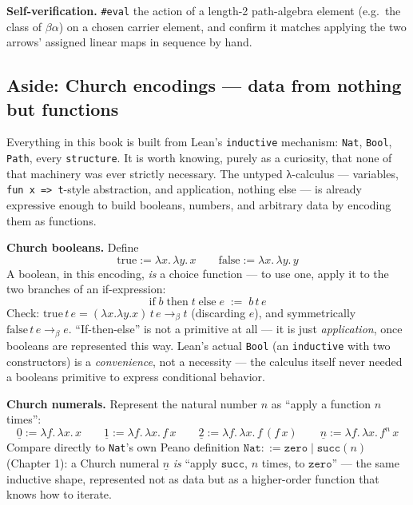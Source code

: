 \textbf{Self-verification.} \texttt{\#eval} the action of a length-2 path-algebra element (e.g.~the class of \(\beta\alpha\)) on a chosen carrier element, and confirm it matches applying the two arrows' assigned linear maps in sequence by hand.

\subsection{Aside: Church encodings --- data from nothing but functions}\label{sec:13-next-steps:03-next-projects:7}

Everything in this book is built from Lean's \texttt{inductive} mechanism: \texttt{Nat}, \texttt{Bool}, \texttt{Path}, every \texttt{structure}. It is worth knowing, purely as a curiosity, that none of that machinery was ever strictly necessary. The untyped λ-calculus --- variables, \texttt{fun x => t}-style abstraction, and application, nothing else --- is already expressive enough to build booleans, numbers, and arbitrary data by encoding them as functions.

\textbf{Church booleans.} Define \[
\mathrm{true} := \lambda x.\, \lambda y.\, x
\qquad
\mathrm{false} := \lambda x.\, \lambda y.\, y
\] A boolean, in this encoding, \emph{is} a choice function --- to use one, apply it to the two branches of an if-expression: \[
\mathrm{if}\; b \;\mathrm{then}\; t \;\mathrm{else}\; e \;:=\; b\, t\, e
\] Check: \(\mathrm{true}\, t\, e = (\lambda x.\lambda y. x)\, t\, e
\longrightarrow_\beta t\) (discarding \(e\)), and symmetrically \(\mathrm{false}\, t\, e \longrightarrow_\beta e\). ``If-then-else'' is not a primitive at all --- it is just \emph{application}, once booleans are represented this way. Lean's actual \texttt{Bool} (an \texttt{inductive} with two constructors) is a \emph{convenience}, not a necessity --- the calculus itself never needed a booleans primitive to express conditional behavior.

\textbf{Church numerals.} Represent the natural number \(n\) as ``apply a function \(n\) times'': \[
\underline{0} := \lambda f.\, \lambda x.\, x
\qquad
\underline{1} := \lambda f.\, \lambda x.\, f\, x
\qquad
\underline{2} := \lambda f.\, \lambda x.\, f\,(f\, x)
\qquad
\underline{n} := \lambda f.\, \lambda x.\, f^n\, x
\] Compare directly to \texttt{Nat}'s own Peano definition \(\mathtt{Nat} ::= \mathtt{zero} \mid \mathtt{succ}(n)\) (Chapter 1): a Church numeral \(\underline{n}\) \emph{is} ``apply \(\mathtt{succ}\), \(n\) times, to \(\mathtt{zero}\)'' --- the same inductive shape, represented not as data but as a higher-order function that knows how to iterate.

